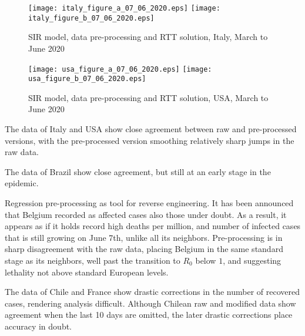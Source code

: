 \documentclass{article}
\begin{document}
\begin{figure}
\begin{center}
{\texttt{[image: italy\_figure\_a\_07\_06\_2020.eps]}}
\qquad
{\texttt{[image: italy\_figure\_b\_07\_06\_2020.eps]}}
\end{center}
\begin{center}
\caption{SIR model, data pre-processing and RTT solution, Italy, March to June 2020
}
\label{fig:italy_sir_model_07_06_2020}
\end{center}
\end{figure}


\begin{figure}
\begin{center}
{\texttt{[image: usa\_figure\_a\_07\_06\_2020.eps]}}
\qquad
{\texttt{[image: usa\_figure\_b\_07\_06\_2020.eps]}}
\end{center}
\begin{center}
\caption{SIR model, data pre-processing and RTT solution, USA, March to June 2020
}
\label{fig:usa_sir_model_07_06_2020}
\end{center}
\end{figure}

\newpage

\noindent The data of Italy and USA show close agreement between raw and pre-processed versions, with the pre-processed version smoothing relatively sharp jumps in the raw data.

\bigskip

\noindent The data of Brazil show close agreement, but still at an early stage in the epidemic.

\bigskip

\noindent Regression pre-processing as tool for reverse engineering. It has been announced that Belgium recorded as affected cases also those under doubt. As a result, it appears as if it holds record high deaths per million, and number of infected cases that is still growing on June 7th, unlike all its neighbors. Pre-processing is in sharp disagreement with the raw data, placing Belgium in the same standard stage as its neighbors, well past the transition to $R_0$ below $1$, and suggesting lethality not above standard European levels.

\bigskip

\noindent The data of Chile and France show drastic corrections in the number of recovered cases, rendering analysis difficult. Although Chilean raw and modified data show agreement when the last 10 days are omitted, the later drastic corrections place accuracy in doubt.
\end{document}
